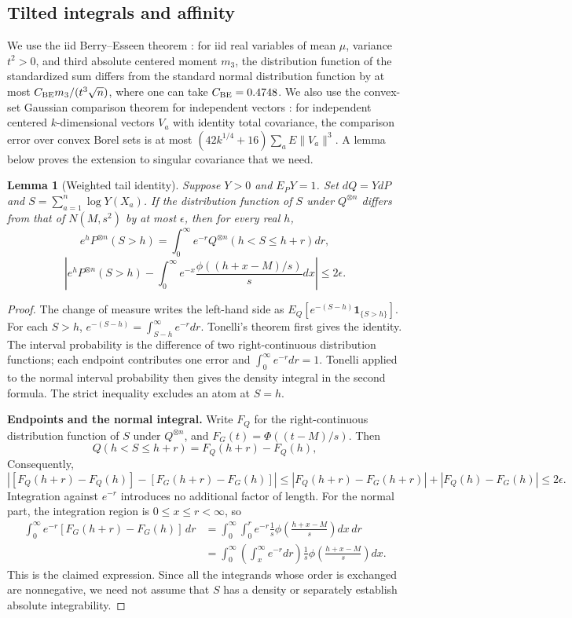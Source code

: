\documentclass[a4paper,11pt]{article}
\newtheorem{lemma}{Lemma}[section]
\theoremstyle{remark}
\begin{document}
\subsection{Tilted integrals and affinity}
We use the iid Berry--Esseen theorem \cite{Shevtsova2011}: for iid real variables of mean $\mu$,
variance $t^2>0$, and third absolute centered moment $m_3$, the distribution function of the standardized sum differs from
the standard normal distribution function by at most $C_{\rm BE}m_3/(t^3\sqrt n)$,
where one can take $C_{\rm BE}=0.4748$.
We also use the convex-set Gaussian comparison theorem for independent vectors \cite{Raic2019}: for independent centered
$k$-dimensional vectors $V_a$ with identity total covariance, the comparison error over convex Borel sets is at most
$(42k^{1/4}+16)\sum_aE\|V_a\|^3$.
A lemma below proves the extension to singular covariance that we need.

\begin{lemma}[Weighted tail identity]\label{lem:paperweighted}
Suppose $Y>0$ and $E_PY=1$. Set $dQ=YdP$ and $S=\sum_{a=1}^n\log Y(X_a)$.
If the distribution function of $S$ under $Q^{\otimes n}$ differs from that of $N(M,s^2)$ by at most
$\epsilon$, then for every real $h$,
\[
 e^hP^{\otimes n}(S>h)
 =\int_0^\infty e^{-r}Q^{\otimes n}(h<S\le h+r)dr,
\]
\[
 \left|e^hP^{\otimes n}(S>h)
 -\int_0^\infty e^{-x}\frac{\phi((h+x-M)/s)}s dx\right|\le2\epsilon.
\]
\end{lemma}
\begin{proof}
The change of measure writes the left-hand side as $E_Q[e^{-(S-h)}\mathbf1_{\{S>h\}}]$.
For each $S>h$, $e^{-(S-h)}=\int_{S-h}^\infty e^{-r}dr$.
Tonelli's theorem first gives the identity. The interval probability is the difference of two right-continuous distribution functions;
each endpoint contributes one error and $\int_0^\infty e^{-r}dr=1$. Tonelli applied to the normal interval probability
then gives the density integral in the second formula. The strict inequality excludes an atom at $S=h$.

\medskip\noindent\textbf{Endpoints and the normal integral.}
Write $F_Q$ for the right-continuous distribution function of $S$ under $Q^{\otimes n}$,
and $F_G(t)=\Phi((t-M)/s)$. Then
\[
 Q(h<S\le h+r)=F_Q(h+r)-F_Q(h),
\]
Consequently,
\[
 \left|[F_Q(h+r)-F_Q(h)]-[F_G(h+r)-F_G(h)]\right|
 \le |F_Q(h+r)-F_G(h+r)|+|F_Q(h)-F_G(h)|\le2\epsilon.
\]
Integration against $e^{-r}$ introduces no additional factor of length. For the normal part, the integration region is
$0\le x\le r<\infty$, so
\begin{align*}
 \int_0^\infty e^{-r}[F_G(h+r)-F_G(h)]\,dr
 &=\int_0^\infty\int_0^r e^{-r}\frac1s
       \phi\!\left(\frac{h+x-M}{s}\right)dx\,dr\\
 &=\int_0^\infty\left(\int_x^\infty e^{-r}dr\right)
       \frac1s\phi\!\left(\frac{h+x-M}{s}\right)dx.
\end{align*}
This is the claimed expression. Since all the integrands whose order is exchanged are nonnegative, we need not assume that $S$ has a density
or separately establish absolute integrability.

\end{proof}
\end{document}
